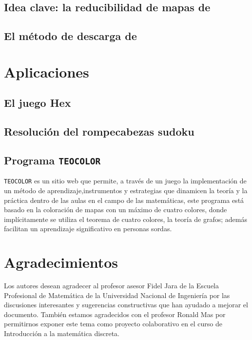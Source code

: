 \documentclass[3p,times,a4paper,twocolumn,authoryear]{elsarticle} %
\begin{document}
\subsection{Idea clave: la reducibilidad de mapas de \citeauthor{birkhoff}}\label{sec:3.4}

\subsection{El método de descarga de \citeauthor{appel}}\label{sec:3.5}

\section{Aplicaciones}\label{sec4}

\subsection{El juego Hex}\label{sec:4.1}

\subsection{Resolución del rompecabezas sudoku}\label{sec:4.2}

\subsection{Programa \texttt{TEOCOLOR}}\label{sec:4.3}

\texttt{TEOCOLOR} es un sitio web que permite, a través de un juego la implementación de un método de aprendizaje,instrumentos y estrategias que dinamicen la teoría y la práctica dentro de las aulas en el campo de las matemáticas, este programa está basado en la coloración de mapas con un máximo de
cuatro colores, donde implícitamente se utiliza el teorema de cuatro colores, la teoría de grafos; además facilitan un aprendizaje significativo en personas sordas.

\section*{Agradecimientos}

Los autores desean agradecer al profesor asesor \linebreak Fidel Jara de la Escuela Profesional de Matemática de la Universidad Nacional de Ingeniería por las  discusiones interesantes y sugerencias constructivas que han ayudado a mejorar el documento. También estamos agradecidos con el profesor Ronald Mas por permitirnos exponer este tema como proyecto colaborativo en el curso de Introducción a la matemática discreta.

\nocite{*}
\printbibliography[title={Referencias bibliográficas}]
\end{document}
